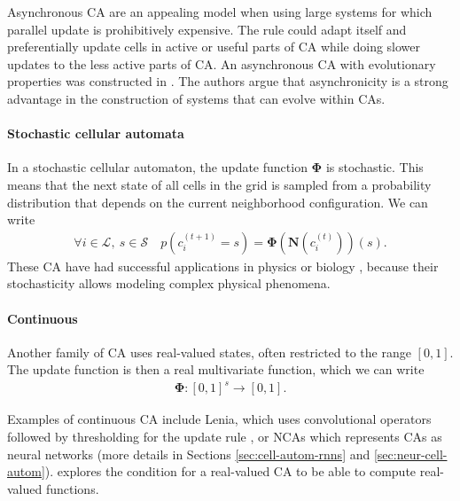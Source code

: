 Asynchronous \ac{CA} are an appealing model when using large systems for which
parallel update is prohibitively expensive. The rule could adapt itself and
preferentially update cells in active or useful parts of \ac{CA} while doing
slower updates to the less active parts of \ac{CA}. An asynchronous \ac{CA}
with evolutionary properties was constructed in
\parencite{nehanivEvolutionAsynchronousCellular2003}. The authors argue that
asynchronicity is a strong advantage in the construction of systems that can evolve
within \acp{CA}.

\paragraph{Stochastic cellular automata}
In a stochastic cellular automaton, the update function $\boldsymbol{\Phi}$ is
stochastic. This means that the next state of all cells in the grid is
sampled from a probability distribution that depends on the current neighborhood
configuration. We can write
\begin{equation}
\begin{aligned}
  \forall i \in \mathcal{L},\ s \in \mathcal{S} \quad p\left(c_{i}^{(t + 1)} = s \right) = \boldsymbol{\Phi} \left(\boldsymbol{N}\left(c_{i}^{(t)}\right)\right)(s).
\end{aligned}
\end{equation}
These \ac{CA} have had successful applications in physics
\parencite{vichniacSimulatingPhysicsCellular1984,
  ottaviSimulationIsingModel1989} or biology
\parencite{boasCellularPottsModel2018}, because their stochasticity allows
modeling complex physical phenomena.

\paragraph{Continuous}
Another family of \ac{CA} uses real-valued states, often restricted to the range
$[0, 1]$. The update function is then a real multivariate function, which we can
write
\begin{equation}
  \begin{aligned}
  \boldsymbol{\Phi}: [0, 1]^{s} \rightarrow [0, 1].
  \end{aligned}
  \label{eq:phi_cont}
\end{equation}

Examples of continuous \ac{CA} include Lenia, which uses convolutional operators
followed by thresholding for the update rule
\parencite{chanLeniaBiologyArtificial2019a}, or \acp{NCA}
\parencite{mordvintsevGrowingNeuralCellular2020} which represents \acp{CA} as
neural networks (more details in Sections \ref{sec:cell-autom-rnns} and
\ref{sec:neur-cell-autom}). \textcite{garzonRealComputationCellular1993}
explores the condition for a real-valued \ac{CA} to be able to compute
real-valued functions.

